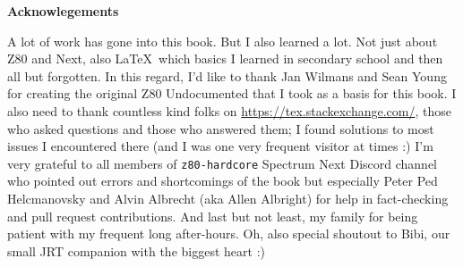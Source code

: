 \begingroup

	\WorkInProgressFullScreen


	\textbf{Acknowlegements}

	A lot of work has gone into this book. But I also learned a lot. Not just about Z80 and Next, also \LaTeX~which basics I learned in secondary school and then all but forgotten. In this regard, I'd like to thank Jan Wilmans and Sean Young for creating the original Z80 Undocumented that I took as a basis for this book. I also need to thank countless kind folks on \url{https://tex.stackexchange.com/}, those who asked questions and those who answered them; I found solutions to most issues I encountered there (and I was one very frequent visitor at times :) I'm very grateful to all members of {\tt z80-hardcore} Spectrum Next Discord channel who pointed out errors and shortcomings of the book but especially Peter Ped Helcmanovsky and Alvin Albrecht (aka Allen Albright) for help in fact-checking and pull request contributions. And last but not least, my family for being patient with my frequent long after-hours. Oh, also special shoutout to Bibi, our small JRT companion with the biggest heart :)

	\vspace*{\fill}

	\WorkInProgressFullScreen

\endgroup
